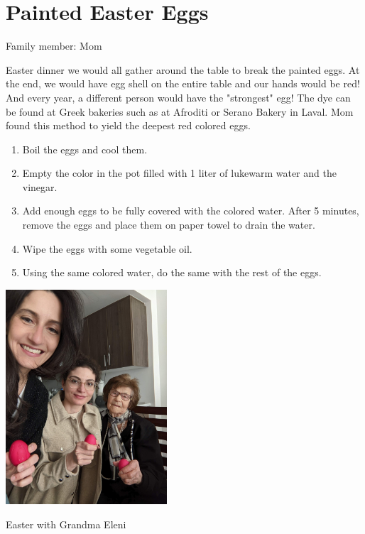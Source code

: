 \chapter{Painted Easter Eggs}
\label{ch:eastereggs}


Family member: Mom

 Easter dinner we would all gather around the table to break the painted eggs. At the end, we would have egg shell on the entire table and our hands would be red! And every year, a different person would have the "strongest" egg!     The dye can be found at Greek bakeries such as at Afroditi or Serano Bakery in Laval. Mom found this method to yield the deepest red colored eggs.

\begin{enumerate}
    \item Boil the eggs and cool them.
    \item Empty the color in the pot filled with 1 liter of lukewarm water and the vinegar.
    \item Add enough eggs to be fully covered with the colored water. After 5 minutes, remove the eggs and place them on paper towel to drain the water.
    \item Wipe the eggs with some vegetable oil.
    \item Using the same colored water, do the same with the rest of the eggs. 
\end{enumerate}

\begin{marginfigure}[20pt]
  \includegraphics[width=60mm]{monanteras/images/Easter eggs with grandma.jpg}
  \caption{Easter with Grandma Eleni}
\end{marginfigure}

